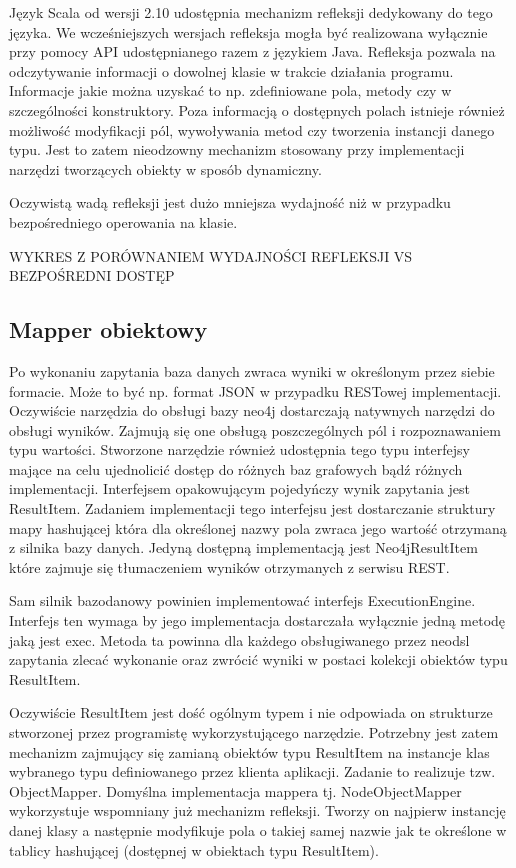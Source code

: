 \documentclass[brudnopis]{xmgr}
\begin{document}
Język Scala od wersji 2.10 udostępnia mechanizm refleksji dedykowany do tego języka. We wcześniejszych wersjach refleksja mogła być realizowana wyłącznie przy pomocy API udostępnianego razem z językiem Java. Refleksja pozwala na odczytywanie informacji o dowolnej klasie w trakcie działania programu. Informacje jakie można uzyskać to np. zdefiniowane pola, metody czy w szczególności konstruktory. Poza informacją o dostępnych polach istnieje również możliwość modyfikacji pól, wywoływania metod czy tworzenia instancji danego typu. Jest to zatem nieodzowny mechanizm stosowany przy implementacji narzędzi tworzących obiekty w sposób dynamiczny.

Oczywistą wadą refleksji jest dużo mniejsza wydajność niż w przypadku bezpośredniego operowania na klasie.

WYKRES Z PORÓWNANIEM WYDAJNOŚCI REFLEKSJI VS BEZPOŚREDNI DOSTĘP

\subsection{Mapper obiektowy}

Po wykonaniu zapytania baza danych zwraca wyniki w określonym przez siebie formacie. Może to być np. format JSON w przypadku RESTowej implementacji. Oczywiście narzędzia do obsługi bazy neo4j dostarczają natywnych narzędzi do obsługi wyników. Zajmują się one obsługą poszczególnych pól i rozpoznawaniem typu wartości. Stworzone narzędzie również udostępnia tego typu interfejsy mające na celu ujednolicić dostęp do różnych baz grafowych bądź różnych implementacji. Interfejsem opakowującym pojedyńczy wynik zapytania jest ResultItem. Zadaniem implementacji tego interfejsu jest dostarczanie struktury mapy hashującej która dla określonej nazwy pola zwraca jego wartość otrzymaną z silnika bazy danych. Jedyną dostępną implementacją jest Neo4jResultItem które zajmuje się tłumaczeniem wyników otrzymanych z serwisu REST.

Sam silnik bazodanowy powinien implementować interfejs ExecutionEngine. Interfejs ten wymaga by jego implementacja dostarczała wyłącznie jedną metodę jaką jest exec. Metoda ta powinna dla każdego obsługiwanego przez neodsl zapytania zlecać wykonanie oraz zwrócić wyniki w postaci kolekcji obiektów typu ResultItem.

Oczywiście ResultItem jest dość ogólnym typem i nie odpowiada on strukturze stworzonej przez programistę wykorzystującego narzędzie. Potrzebny jest zatem mechanizm zajmujący się zamianą obiektów typu ResultItem na instancje klas wybranego typu definiowanego przez klienta aplikacji. Zadanie to realizuje tzw. ObjectMapper. Domyślna implementacja mappera tj. NodeObjectMapper wykorzystuje wspomniany już mechanizm refleksji. Tworzy on najpierw instancję danej klasy a następnie modyfikuje pola o takiej samej nazwie jak te określone w tablicy hashującej (dostępnej w obiektach typu ResultItem).
\end{document}
